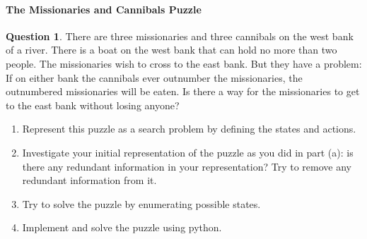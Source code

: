 \documentclass[11pt,a4paper]{article}
\theoremstyle{definition}%
\newtheorem{Q}{Question}[] %
\begin{document}
\paragraph{ The Missionaries and Cannibals Puzzle}
\begin{Q}
    There are three missionaries and three cannibals on the west bank of a river. There is a
boat on the west bank that can hold no more than two people. The missionaries wish to
cross to the east bank. But they have a problem: If on either bank the cannibals ever
outnumber the missionaries, the outnumbered missionaries will be eaten. Is there a way for
the missionaries to get to the east bank without losing anyone?

\begin{enumerate}
    \item Represent this puzzle as a search problem by defining the states and actions.
    \item Investigate your initial representation of the puzzle as you did in part (a): is there
any redundant information in your representation? Try to remove any redundant
information from it.
    \item Try to solve the puzzle by enumerating possible states.
    \item Implement and solve the puzzle using python. 
\end{enumerate}


\end{Q}
\end{document}
